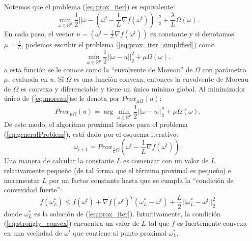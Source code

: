 \documentclass[12pt,draftcls, onecolumn, letterpaper,compsoc]{IEEEtran}
\begin{document}
Notemos que el problema (\ref{eq:prox_iter}) es equivalente:
\begin{equation}\label{eq:prox_iter_simplified}
    \min_{\omega \in \mathbb{R}^{p}} \frac{1}{2}||\omega - (\omega^t - \frac{1}{L}\nabla f(\omega^t)) ||_2^2 + \frac{\lambda}{L}\Omega(\omega).
\end{equation}
En cada paso, el vector $u=(\omega^t - \frac{1}{L}\nabla f(\omega^t))$ es constante y si denotamos $\mu=\frac{\lambda}{L}$, podemos escribir el problema (\ref{eq:prox_iter_simplified}) como
\begin{equation}\label{eq:moreau}
    \min_{\omega \in \mathbb{R}^{p}} \frac{1}{2}||\omega - u ||_2^2 + \mu\Omega(\omega).
\end{equation}
a esta funci\'{o}n se le conoce como la ``envolvente de Moreau'' de $\Omega$ con par\'{a}metro $\mu$, evaluada en $u$. Si $\Omega$ es una funci\'{o}n convexa, entonces la envolvente de Moreau de $\Omega$ es convexa y diferenciable y tiene un \'{u}nico m\'{i}nimo global. Al minimizador \'{u}nico de (\ref{eq:moreau})se le denota por $Prox_{\mu \Omega}(u)$:
\begin{equation}\label{eq:prox}
    Prox_{\mu \Omega}(u) = \arg\min_{\omega \in \mathbb{R}^{p}} \frac{1}{2}||\omega - u||_2^{2} + \mu\Omega(\omega).
\end{equation}
De este modo, el algoritmo proximal b\'{a}sico para el problema (\ref{eq:generalProblem}), est\'{a} dado por el esquema iterativo:
\begin{equation}\label{eq:prox_iter_compact}
    \omega_{t+1} = Prox_{\frac{\lambda}{L}\Omega}(\omega^t - \frac{1}{L}\nabla f(\omega^t)).
\end{equation}
Una manera de calcular la constante $L$ es comenzar con un valor de $L$ relativamente peque\~{n}o (de tal forma que el t\'{e}rmino proximal es peque\~{n}o) e incrementar $L$ por un factor constante hasta que se cumpla la ``condici\'{o}n de convexidad fuerte'':
\begin{equation}\label{eq:strongly_convex}
    f(\omega^{*}_L) \leq f(\omega^t) + \nabla f(\omega^t)^{T}(\omega^{*}_L - \omega^{t}) + \frac{L}{2}||\omega_L^{*} - \omega^{t}||_2^{2}
\end{equation}
donde $\omega^{*}_L$ es la soluci\'{o}n de (\ref{eq:prox_iter}). Intuitivamente, la condici\'{o}n (\ref{eq:strongly_convex}) encuentra un valor de $L$ tal que $f$ es fuertemente convexa en una vecindad de $\omega^{t}$ que contiene al punto proximal $\omega^{*}_L$.\\
\end{document}

